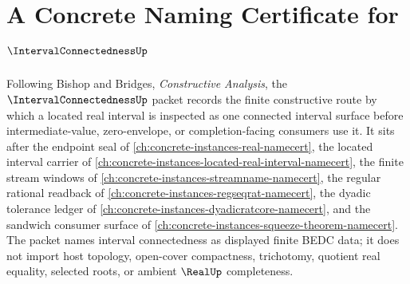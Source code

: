 \chapter{A Concrete Naming Certificate for $\IntervalConnectednessUp$}
\label{ch:concrete-instances-interval-connectedness-namecert}

Following Bishop and Bridges, \emph{Constructive Analysis}, the $\IntervalConnectednessUp$ packet records the finite constructive route by which a located real interval is inspected as one connected interval surface before intermediate-value, zero-envelope, or completion-facing consumers use it. It sits after the endpoint seal of \autoref{ch:concrete-instances-real-namecert}, the located interval carrier of \autoref{ch:concrete-instances-located-real-interval-namecert}, the finite stream windows of \autoref{ch:concrete-instances-streamname-namecert}, the regular rational readback of \autoref{ch:concrete-instances-regseqrat-namecert}, the dyadic tolerance ledger of \autoref{ch:concrete-instances-dyadicratcore-namecert}, and the sandwich consumer surface of \autoref{ch:concrete-instances-squeeze-theorem-namecert}. The packet names interval connectedness as displayed finite BEDC data; it does not import host topology, open-cover compactness, trichotomy, quotient real equality, selected roots, or ambient $\RealUp$ completeness.

